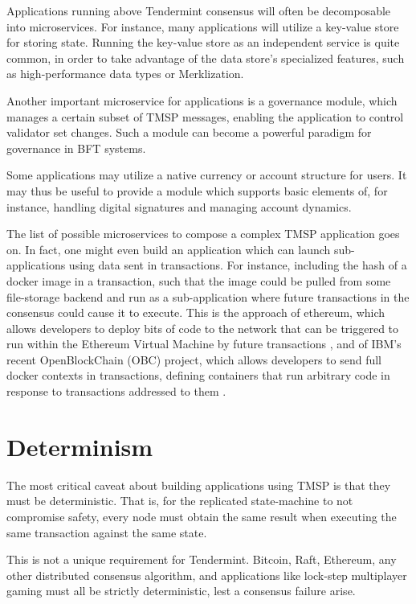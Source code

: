 Applications running above Tendermint consensus will often be decomposable into microservices.
For instance, many applications will utilize a key-value store for storing state.
Running the key-value store as an independent service is quite common, 
in order to take advantage of the data store's specialized features, such as high-performance data types or Merklization.

Another important microservice for applications is a governance module, 
which manages a certain subset of TMSP messages, enabling the application to control validator set changes.
Such a module can become a powerful paradigm for governance in BFT systems.

Some applications may utilize a native currency or account structure for users.
It may thus be useful to provide a module which supports basic elements of, for instance,
handling digital signatures and managing account dynamics.

The list of possible microservices to compose a complex TMSP application goes on. 
In fact, one might even build an application which can launch sub-applications using data sent in transactions.
For instance, including the hash of a docker image in a transaction,
such that the image could be pulled from some file-storage backend and run as a sub-application where
future transactions in the consensus could cause it to execute. 
This is the approach of ethereum, 
which allows developers to deploy bits of code to the network that can be triggered to run within the Ethereum Virtual Machine by future transactions \cite{ethereum},
and of IBM's recent OpenBlockChain (OBC) project, which allows developers to send full docker contexts in transactions, 
defining containers that run arbitrary code in response to transactions addressed to them \cite{obc}.

\section{Determinism}

The most critical caveat about building applications using TMSP is that they must be deterministic.
That is, for the replicated state-machine to not compromise safety, 
every node must obtain the same result when executing the same transaction against the same state.

This is not a unique requirement for Tendermint. Bitcoin, Raft, Ethereum, any other distributed consensus algorithm,
and applications like lock-step multiplayer gaming must all be strictly deterministic, lest a consensus failure arise.

